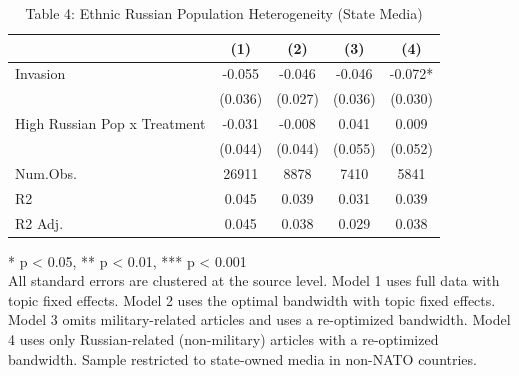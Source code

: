 \begin{table}[!t]
\caption{Table 4: Ethnic Russian Population Heterogeneity (State Media)} 
\fontsize{12.0pt}{14.4pt}\selectfont
\begin{tabular*}{\linewidth}{@{\extracolsep{\fill}}lcccc}
\toprule
  & (1) & (2) & (3) & (4) \\ 
\midrule\addlinespace[2.5pt]
Invasion & -0.055 & -0.046 & -0.046 & -0.072* \\ 
 & (0.036) & (0.027) & (0.036) & (0.030) \\ 
High Russian Pop x Treatment & -0.031 & -0.008 & 0.041 & 0.009 \\ 
{} & {(0.044)} & {(0.044)} & {(0.055)} & {(0.052)} \\ 
Num.Obs. & 26911 & 8878 & 7410 & 5841 \\ 
R2 & 0.045 & 0.039 & 0.031 & 0.039 \\ 
R2 Adj. & 0.045 & 0.038 & 0.029 & 0.038 \\ 
\bottomrule
\end{tabular*}
\begin{minipage}{\linewidth}
* p < 0.05, ** p < 0.01, *** p < 0.001\\
All standard errors are clustered at the source level. Model 1 uses full data
with topic fixed effects. Model 2 uses the optimal bandwidth with topic fixed
effects. Model 3 omits military-related articles and uses a re-optimized
bandwidth. Model 4 uses only Russian-related (non-military) articles with a
re-optimized bandwidth. Sample restricted to state-owned media in non-NATO
countries.\\
\end{minipage}
\end{table}

